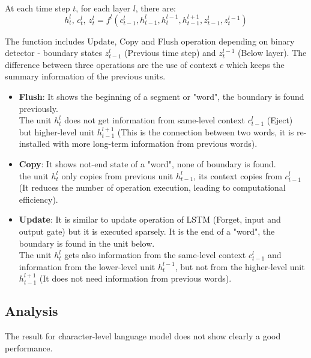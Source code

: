 \documentclass{article}
\begin{document}
At each time step $t$, for each layer $l$, there are:
\begin{equation}
h_t^l,\, c_t^l,\, z_t^l = f^l (c_{t-1}^l, h_{t-1}^l, h_t^{l-1}, h_{t-1}^{l+1}, z_{t-1}^l, z_t^{l-1})
\end{equation}

The function includes Update, Copy and Flush operation depending on binary detector - boundary states $z_{t-1}^l$ (Previous time step) and $z_t^{l-1}$ (Below layer).
The difference between three operations are the use of context $c$ which keeps the summary information of the previous units.
\begin{itemize}
\item \textbf{Flush}: It shows the beginning of a segment or "word", the boundary is found previously.
\\ The unit $h_t^l$ does not get information from same-level context $c_{t-1}^l$ (Eject) but higher-level unit $h_{t-1}^{l+1}$ (This is the connection between two words, it is re-installed with more long-term information from previous words). 

\item  \textbf{Copy}: It shows not-end state of a "word", none of boundary is found.
\\ the unit  $h_t^l$ only copies from previous unit $h_{t-1}^l$, its context copies from $c_{t-1}^l$ (It reduces the number of operation execution, leading to computational efficiency).

\item \textbf{Update}: It is similar to update operation of LSTM (Forget, input and output gate) but it is executed sparsely. It is the end of a "word", the boundary is found in the unit below.
\\ The unit $h_t^l$ gets also information from the same-level context $c_{t-1}^l$ and information from the lower-level unit $h_t^{l-1}$, but not from the higher-level unit $h_{t-1}^{l+1}$ (It does not need information from previous words).
\end{itemize}

\subsection{Analysis}
The result for character-level language model does not show clearly a good performance.




\end{document}

